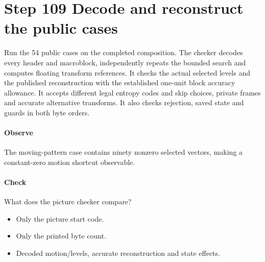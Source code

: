 \section{Step 109 Decode and reconstruct the public cases}\label{h263-picture-s09}
Run the 54 public cases on the completed composition. The checker decodes every
header and macroblock, independently repeats the bounded search and computes
floating transform references. It checks the actual selected levels and the
published reconstruction with the established one-unit block accuracy allowance.
It accepts different legal entropy codes and skip choices, private frames and
accurate alternative transforms. It also checks rejection, saved state and guards
in both byte orders.

\paragraph{Observe} The moving-pattern case contains ninety nonzero selected vectors, making a constant-zero motion shortcut observable.
\paragraph{Check} What does the picture checker compare?
\begin{itemize}
  \item[A.] Only the picture start code.
  \item[B.] Only the printed byte count.
  \item[C.] Decoded motion/levels, accurate reconstruction and state effects.
\end{itemize}
